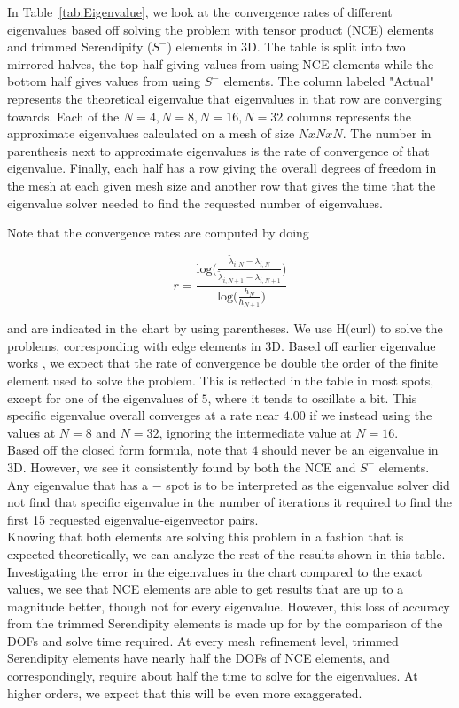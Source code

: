\documentclass[manuscript,screen]{acmart}
\begin{document}
\noindent In Table~\ref{tab:Eigenvalue}, we look at the convergence rates of different eigenvalues based off solving the problem with tensor product (NCE) elements and trimmed Serendipity ($S^-$) elements in 3D.  The table is split into two mirrored halves, the top half giving values from using NCE elements while the bottom half gives values from using $S^-$ elements.  The column labeled "Actual" represents the theoretical eigenvalue that eigenvalues in that row are converging towards.  Each of the $N=4, N=8, N=16, N=32$ columns represents the approximate eigenvalues calculated on a mesh of size $N x N x N$.  The number in parenthesis next to approximate eigenvalues is the rate of convergence of that eigenvalue.  Finally, each half has a row giving the overall degrees of freedom in the mesh at each given mesh size and another row that gives the time that the eigenvalue solver needed to find the requested number of eigenvalues.


\noindent Note that the convergence rates are computed by doing

\[r = \frac{\text{log}\bigg(\frac{\tilde{\lambda}_{i,N} - \lambda_{i,N}}{\tilde{\lambda}_{i,N+1} - \lambda_{i,N+1}} \bigg)}{\text{log}\bigg( \frac{h_N}{h_{N+1}} \bigg)} \]

\noindent and are indicated in the chart by using parentheses.  We use H$($curl$)$ to solve the problems, corresponding with edge elements in 3D.  Based off earlier eigenvalue works \cite{boffi2010finite}, we expect that the rate of convergence be double the order of the finite element used to solve the problem.  This is reflected in the table in most spots, except for one of the eigenvalues of $5$, where it tends to oscillate a bit.  This specific eigenvalue overall converges at a rate near $4.00$ if we instead using the values at $N=8$ and $N=32$, ignoring the intermediate value at $N=16$.  \\

\noindent Based off the closed form formula, note that $4$ should never be an eigenvalue in 3D. However, we see it consistently found by both the NCE and $S^-$ elements.  Any eigenvalue that has a $-$ spot is to be interpreted as the eigenvalue solver did not find that specific eigenvalue in the number of iterations it required to find the first 15 requested eigenvalue-eigenvector pairs.\\

\noindent Knowing that both elements are solving this problem in a fashion that is expected theoretically, we can analyze the rest of the results shown in this table.  Investigating the error in the eigenvalues in the chart compared to the exact values, we see that NCE elements are able to get results that are up to a magnitude better, though not for every eigenvalue.  However, this loss of accuracy from the trimmed Serendipity elements is made up for by the comparison of the DOFs and solve time required.  At every mesh refinement level, trimmed Serendipity elements have nearly half the DOFs of NCE elements, and correspondingly, require about half the time to solve for the eigenvalues.  At higher orders, we expect that this will be even more exaggerated.  \\
\end{document}
